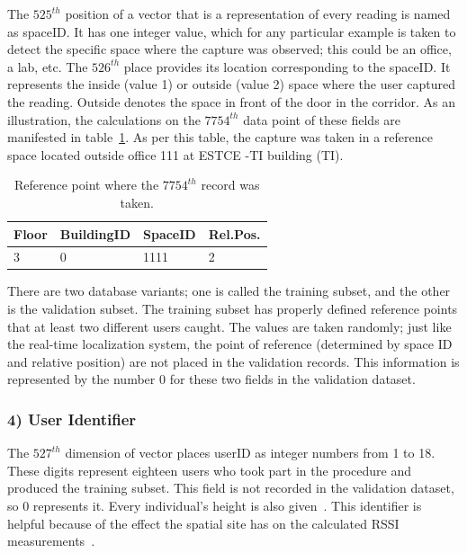 \documentclass[a4paper,singleside,12pt]{report} %
\begin{document}
					The $525^{th}$ position of a vector that is a representation of every reading is named as spaceID. 
					It has one integer value, which for any particular example is taken to detect the specific space where the capture was observed; this could be an office, a lab, etc. 
					The $526^{th}$ place provides its location corresponding to the spaceID. It represents the inside (value 1) or outside (value 2) space where the user captured the reading. 
					Outside denotes the space in front of the door in the corridor. As an illustration, the calculations on the $7754^{th}$ data point of these fields are manifested in table~\ref{table3.2}. 
					As per this table, the capture was taken in a reference space located outside office 111 at ESTCE -TI building (TI).
					
					\begin{table}[!htb]
					\centering
					\begin{tabular}{llll}
					\hline
					Floor & BuildingID & SpaceID & Rel.Pos. \\ \hline
					3     & 0          & 1111    & 2   \\     \hline 
					\end{tabular}
					\caption{Reference point where the $7754^{th}$ record was taken.}
					\label{table3.2}
					\end{table}
				
					There are two database variants; one is called the training subset, and the other is the validation subset. The training subset has properly defined reference points that at least two different users caught. 
					The values are taken randomly; just like the real-time localization system, the point of reference (determined by space ID and relative position) are not placed in the validation records. 
					This information is represented by the number 0 for these two fields in the validation dataset. 

				\subsubsection{4) User Identifier}

					The $527^{th}$ dimension of vector places userID as integer numbers from 1 to 18. 
					These digits represent eighteen users who took part in the procedure and produced the training subset. 
					This field is not recorded in the validation dataset, so 0 represents it. Every individual’s height is also given~\cite{ujiindoor-data}. 
					This identifier is helpful because of the effect the spatial site has on the calculated RSSI measurements~\cite{1331706}. 
\end{document}
